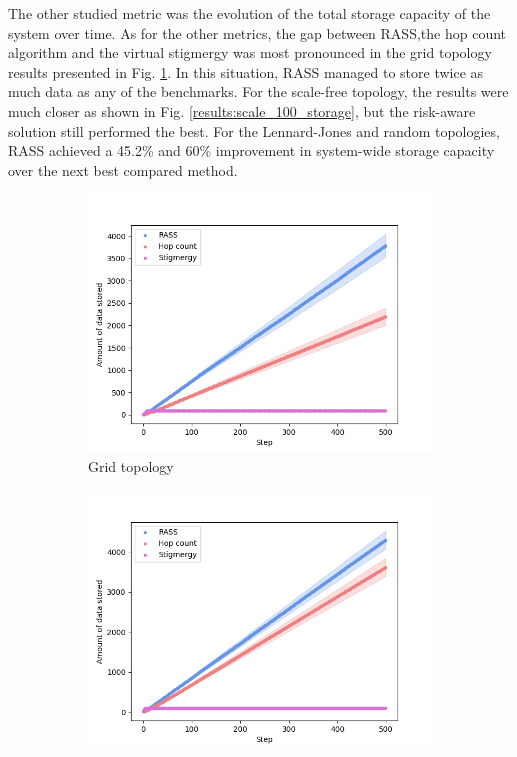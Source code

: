 The other studied metric was the evolution of the total storage capacity of the system over time. As for the other metrics, the gap between \ac{RASS},the hop count algorithm and the virtual stigmergy was most pronounced in the grid topology results presented in Fig. \ref{results:grid_100_storage}. In this situation, \ac{RASS} managed to store twice as much data as any of the benchmarks. For the scale-free topology, the results were much closer as shown in Fig. \ref{results:scale_100_storage}, but the risk-aware solution still performed the best. For the Lennard-Jones and random topologies, \ac{RASS} achieved a 45.2\% and 60\% improvement in system-wide storage capacity over the next best compared method.

\begin{figure}
    \centering
    \begin{subfigure}{0.48\textwidth}
        \includegraphics[width=\textwidth]{figures/dora_mesh/grid_storage.png}
        \caption{Grid topology}
        \label{results:grid_100_storage}
    \end{subfigure}
    \begin{subfigure}{0.48\textwidth}
        \includegraphics[width=\textwidth]{figures/dora_mesh/scale_storage.png}

\end{subfigure}
\end{figure}
